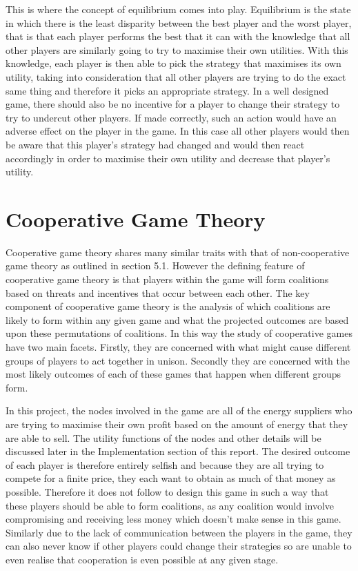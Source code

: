 \documentclass[a4paper, notitlepage]{report}
\begin{document}
This is where the concept of equilibrium comes into play. Equilibrium is the
state in which there is the least disparity between the best player and the
worst player, that is that each player performs the best that it can with the
knowledge that all other players are similarly going to try to maximise their
own utilities. With this knowledge, each player is then able to pick the
strategy that maximises its own utility, taking into consideration that all
other players are trying to do the exact same thing and therefore it picks an
appropriate strategy. In a well designed game, there should also be no incentive
for a player to change their strategy to try to undercut other players. If made
correctly, such an action would have an adverse effect on the player in the
game. In this case all other players would then be aware that this player’s
strategy had changed and would then react accordingly in order to maximise their
own utility and decrease that player’s utility.
\section{Cooperative Game Theory}
\label{sec:org04ccf20}
Cooperative game theory shares many similar traits with that of non-cooperative
game theory as outlined in section 5.1. However the defining feature of
cooperative game theory is that players within the game will form coalitions
based on threats and incentives that occur between each other. The key component
of cooperative game theory is the analysis of which coalitions are likely to
form within any given game and what the projected outcomes are based upon these
permutations of coalitions. In this way the study of cooperative games have two
main facets. Firstly, they are concerned with what might cause different groups
of players to act together in unison. Secondly they are concerned with the most
likely outcomes of each of these games that happen when different groups form.

In this project, the nodes involved in the game are all of the energy suppliers
who are trying to maximise their own profit based on the amount of energy that
they are able to sell. The utility functions of the nodes and other details will
be discussed later in the Implementation section of this report. The desired
outcome of each player is therefore entirely selfish and because they are all
trying to compete for a finite price, they each want to obtain as much of that
money as possible. Therefore it does not follow to design this game in such a
way that these players should be able to form coalitions, as any coalition would
involve compromising and receiving less money which doesn’t make sense in this
game. Similarly due to the lack of communication between the players in the
game, they can also never know if other players could change their strategies so
are unable to even realise that cooperation is even possible at any given stage.
\end{document}
